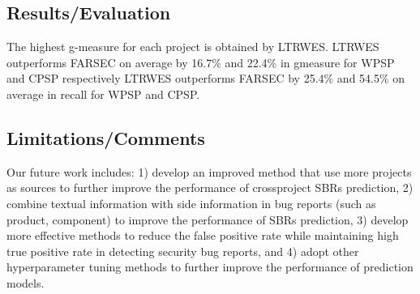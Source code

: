 \subsection{Results/Evaluation}
The highest g-measure for each project is obtained by LTRWES. LTRWES outperforms FARSEC on average by 16.7\% and 22.4\% in gmeasure for WPSP and CPSP respectively
LTRWES outperforms FARSEC by 25.4\% and 54.5\% on average in recall for WPSP and CPSP.
\subsection{Limitations/Comments}
Our future work includes: 1) develop an improved method that use more projects as sources to further improve the performance of crossproject SBRs prediction, 2) combine textual information with side information in bug reports (such as product, component) to improve the performance of SBRs prediction, 3) develop more effective methods to reduce the false positive rate while maintaining high true positive rate in detecting security bug reports, and 4) adopt other hyperparameter tuning methods to further improve the performance of prediction models.
\newpage

